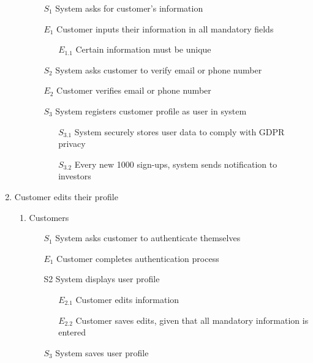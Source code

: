 \documentclass[]{article}
\begin{document}
\begin{enumerate}[{\textbf{BE}}1.]
\begin{enumerate}[{\textbf{VP}1}.1]
            \begin{enumerate}
                \item[$S_1$] System asks for customer’s information
                \item[$E_1$] Customer inputs their information in all mandatory fields
                \begin{enumerate}
                \item[$E_{1.1}$] Certain information must be unique
                \end{enumerate}
\color{blue}
                \item[$S_2$] System asks customer to verify email or phone number
                \item[$E_2$] Customer verifies email or phone number
\color{black}
                \item[$S_3$] System registers customer profile as user in system
                \begin{enumerate}
                \item[$S_{3.1}$] System securely stores user data to comply with GDPR privacy
\color{blue}
                \item[$S_{3.2}$] Every new 1000 sign-ups, system sends notification to investors
\color{black}
                \end{enumerate}
            \end{enumerate}
    \end{enumerate}
    \item Customer edits their profile
    \begin{enumerate}[{\textbf{VP2}}.1]
        \item Customers
            \begin{enumerate}
                \item[$S_1$] System asks customer to authenticate themselves
                    \item[$E_1$] Customer completes authentication process
                \item[S2] System displays user profile
                \begin{enumerate}
                    \item[$E_{2.1}$] Customer edits information
                    \item[$E_{2.2}$] Customer saves edits, given that all mandatory information is entered
                \end{enumerate}
                \item[$S_3$] System saves user profile

\end{enumerate}
\end{enumerate}
\end{enumerate}
\end{document}
